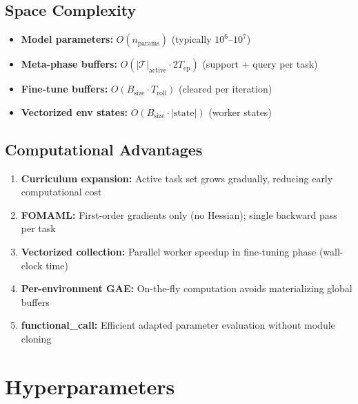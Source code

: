 \documentclass[11pt,a4paper]{article}
\begin{document}
\subsection{Space Complexity}

\begin{itemize}
	\item \textbf{Model parameters:} $O(n_{\text{params}})$ (typically $10^6$--$10^7$)
	\item \textbf{Meta-phase buffers:} $O(|\mathcal{T}|_{\text{active}} \cdot 2T_{\text{ep}})$ (support + query per task)
	\item \textbf{Fine-tune buffers:} $O(B_{\text{size}} \cdot T_{\text{roll}})$ (cleared per iteration)
	\item \textbf{Vectorized env states:} $O(B_{\text{size}} \cdot |\text{state}|)$ (worker states)
\end{itemize}

\subsection{Computational Advantages}

\begin{enumerate}
	\item \textbf{Curriculum expansion:} Active task set grows gradually, reducing early computational cost
	\item \textbf{FOMAML:} First-order gradients only (no Hessian); single backward pass per task
	\item \textbf{Vectorized collection:} Parallel worker speedup in fine-tuning phase (wall-clock time)
	\item \textbf{Per-environment GAE:} On-the-fly computation avoids materializing global buffers
	\item \textbf{functional\_call:} Efficient adapted parameter evaluation without module cloning
\end{enumerate}

\section{Hyperparameters}
\end{document}
